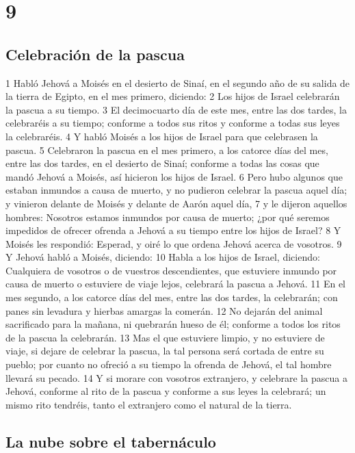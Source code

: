 \chapter{9}

\section*{Celebración de la pascua}


1 Habló Jehová a Moisés en el desierto de Sinaí, en el segundo año de su salida de la tierra de Egipto, en el mes primero, diciendo:
2 Los hijos de Israel celebrarán la pascua a su tiempo.
3 El decimocuarto día de este mes, entre las dos tardes, la celebraréis a su tiempo; conforme a todos sus ritos y conforme a todas sus leyes la celebraréis.
4 Y habló Moisés a los hijos de Israel para que celebrasen la pascua.
5 Celebraron la pascua en el mes primero, a los catorce días del mes, entre las dos tardes, en el desierto de Sinaí; conforme a todas las cosas que mandó Jehová a Moisés, así hicieron los hijos de Israel.
6 Pero hubo algunos que estaban inmundos a causa de muerto, y no pudieron celebrar la pascua aquel día; y vinieron delante de Moisés y delante de Aarón aquel día, 
7 y le dijeron aquellos hombres: Nosotros estamos inmundos por causa de muerto; ¿por qué seremos impedidos de ofrecer ofrenda a Jehová a su tiempo entre los hijos de Israel?
8 Y Moisés les respondió: Esperad, y oiré lo que ordena Jehová acerca de vosotros.
9 Y Jehová habló a Moisés, diciendo:
10 Habla a los hijos de Israel, diciendo: Cualquiera de vosotros o de vuestros descendientes, que estuviere inmundo por causa de muerto o estuviere de viaje lejos, celebrará la pascua a Jehová.
11 En el mes segundo, a los catorce días del mes, entre las dos tardes, la celebrarán; con panes sin levadura y hierbas amargas la comerán.
12 No dejarán del animal sacrificado para la mañana, ni quebrarán hueso de él; conforme a todos los ritos de la pascua la celebrarán.
13 Mas el que estuviere limpio, y no estuviere de viaje, si dejare de celebrar la pascua, la tal persona será cortada de entre su pueblo; por cuanto no ofreció a su tiempo la ofrenda de Jehová, el tal hombre llevará su pecado.
14 Y si morare con vosotros extranjero, y celebrare la pascua a Jehová, conforme al rito de la pascua y conforme a sus leyes la celebrará; un mismo rito tendréis, tanto el extranjero como el natural de la tierra.
\section*{La nube sobre el tabernáculo }

